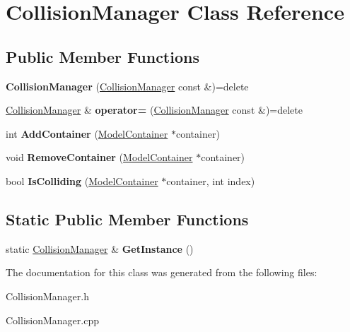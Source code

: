 \hypertarget{class_collision_manager}{}\section{Collision\+Manager Class Reference}
\label{class_collision_manager}
\subsection*{Public Member Functions}
\begin{DoxyCompactItemize}
\item 
\hypertarget{class_collision_manager_a31a5f57dc2974068f3a8460710fcb129}{}{\bfseries Collision\+Manager} (\hyperlink{class_collision_manager}{Collision\+Manager} const \&)=delete\label{class_collision_manager_a31a5f57dc2974068f3a8460710fcb129}

\item 
\hypertarget{class_collision_manager_aad2b15b4b3477b30c5a4762d539f6074}{}\hyperlink{class_collision_manager}{Collision\+Manager} \& {\bfseries operator=} (\hyperlink{class_collision_manager}{Collision\+Manager} const \&)=delete\label{class_collision_manager_aad2b15b4b3477b30c5a4762d539f6074}

\item 
\hypertarget{class_collision_manager_af89588cea264c9a154955ce269725f8d}{}int {\bfseries Add\+Container} (\hyperlink{class_model_container}{Model\+Container} $\ast$container)\label{class_collision_manager_af89588cea264c9a154955ce269725f8d}

\item 
\hypertarget{class_collision_manager_af57c222f9832682b7742de3863cca237}{}void {\bfseries Remove\+Container} (\hyperlink{class_model_container}{Model\+Container} $\ast$container)\label{class_collision_manager_af57c222f9832682b7742de3863cca237}

\item 
\hypertarget{class_collision_manager_a039ee08a27ee8d3390f29501900036fa}{}bool {\bfseries Is\+Colliding} (\hyperlink{class_model_container}{Model\+Container} $\ast$container, int index)\label{class_collision_manager_a039ee08a27ee8d3390f29501900036fa}

\end{DoxyCompactItemize}
\subsection*{Static Public Member Functions}
\begin{DoxyCompactItemize}
\item 
\hypertarget{class_collision_manager_a02b247c273929839c9957ed08073597f}{}static \hyperlink{class_collision_manager}{Collision\+Manager} \& {\bfseries Get\+Instance} ()\label{class_collision_manager_a02b247c273929839c9957ed08073597f}

\end{DoxyCompactItemize}


The documentation for this class was generated from the following files\+:\begin{DoxyCompactItemize}
\item 
Collision\+Manager.\+h\item 
Collision\+Manager.\+cpp\end{DoxyCompactItemize}
